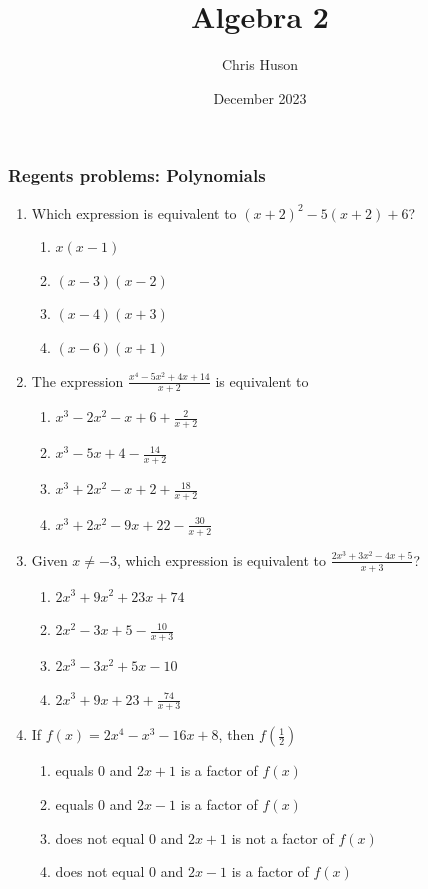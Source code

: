 \documentclass[12pt, twoside]{article}
\title{Algebra 2}
\author{Chris Huson}
\date{December 2023}
\begin{document}
\subsubsection*{Regents problems: Polynomials}
\begin{enumerate}[itemsep=0.5cm]
\item Which expression is equivalent to $(x + 2)^2 - 5(x + 2) + 6$? %
\begin{enumerate}
    \item $x(x - 1)$
    \item $(x - 3)(x - 2)$
    \item $(x - 4)(x + 3)$
    \item $(x - 6)(x + 1)$
\end{enumerate}

\item The expression $\displaystyle \frac{x^4 - 5x^2 + 4x + 14}{x+2}$ is equivalent to %
\begin{enumerate}
    \item $\displaystyle x^3 - 2x^2 - x + 6 + \frac{2}{x + 2}$
    \item $\displaystyle x^3 - 5x + 4 - \frac{14}{x + 2}$
    \item $\displaystyle x^3 + 2x^2 - x + 2 + \frac{18}{x + 2}$
    \item $\displaystyle x^3 + 2x^2 - 9x + 22 - \frac{30}{x + 2}$
\end{enumerate}

\item Given $x \ne -3$, which expression is equivalent to $\displaystyle \frac{2x^3 + 3x^2 - 4x + 5}{x+3}$? %
\begin{enumerate}
    \item $\displaystyle 2x^3 + 9x^2 + 23x + 74$
    \item $\displaystyle 2x^2 - 3x + 5 - \frac{10}{x+3}$
    \item $\displaystyle 2x^3 -3x^2 + 5x - 10$
    \item $\displaystyle 2x^3 + 9x + 23 + \frac{74}{x+3}$
\end{enumerate}

\item If \(f(x) = 2x^4 - x^3 - 16x + 8\), then \(f\left(\frac{1}{2}\right)\) %
\begin{enumerate}
    \item equals 0 and \(2x + 1\) is a factor of \(f(x)\)
    \item equals 0 and \(2x - 1\) is a factor of \(f(x)\)
    \item does not equal 0 and \(2x + 1\) is not a factor of \(f(x)\)
    \item does not equal 0 and \(2x - 1\) is a factor of \(f(x)\)
\end{enumerate}


\end{enumerate}
\end{document}
